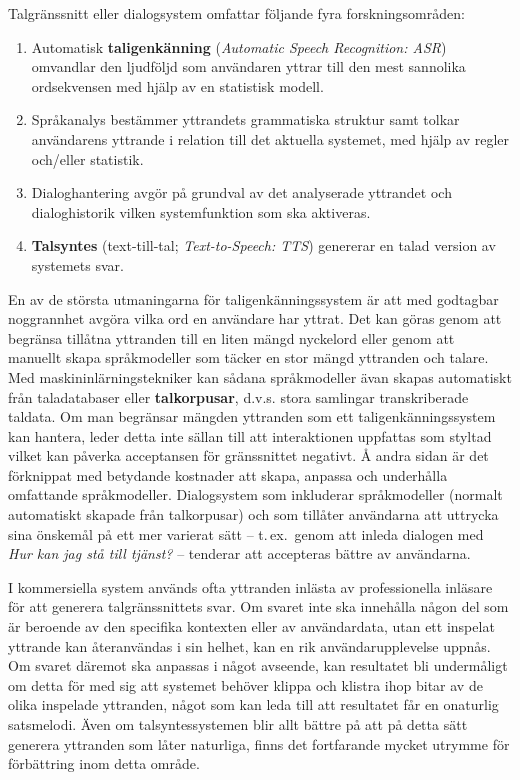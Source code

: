 \begin{multicols}{2}
Talgränssnitt eller dialogsystem omfattar följande fyra
forskningsområden:

\begin{enumerate}
\item Automatisk \textbf{taligenkänning} (\emph{Automatic Speech
  Recognition: ASR}) omvandlar den ljudföljd som användaren yttrar
  till den mest sannolika ordsekvensen med hjälp av en statistisk
  modell.
\item Språkanalys bestämmer yttrandets grammatiska struktur samt
  tolkar användarens yttrande i relation till det aktuella systemet,
  med hjälp av regler och/eller statistik.
\item Dialoghantering avgör på grundval av det analyserade yttrandet
  och dialoghistorik vilken systemfunktion som ska aktiveras.
\item \textbf{Talsyntes} (text-till-tal; \emph{Text-to-Speech: TTS})
  genererar en talad version av systemets svar.
\end{enumerate}

En av de största utmaningarna för taligenkänningssystem är att med
godtagbar noggrannhet avgöra vilka ord en användare har yttrat. Det
kan göras genom att begränsa tillåtna yttranden till en liten mängd
nyckelord eller genom att manuellt skapa språkmodeller som täcker en
stor mängd yttranden och talare. Med maskininlärningstekniker kan
sådana språkmodeller ävan skapas automatiskt från taladatabaser eller
\textbf{talkorpusar}, d.v.s. stora samlingar transkriberade
taldata. Om man begränsar mängden yttranden som ett
taligenkänningssystem kan hantera, leder detta inte sällan till att
interaktionen uppfattas som styltad vilket kan påverka acceptansen för
gränssnittet negativt. Å andra sidan är det förknippat med betydande
kostnader att skapa, anpassa och underhålla omfattande
språkmodeller. Dialogsystem som inkluderar språkmodeller (normalt
automatiskt skapade från talkorpusar) och som tillåter användarna att
uttrycka sina önskemål på ett mer varierat sätt -- t.\,ex.~genom att
inleda dialogen med \textit{Hur kan jag stå till tjänst?} -- tenderar
att accepteras bättre av användarna.


I kommersiella system används ofta yttranden inlästa av professionella
inläsare för att generera talgränssnittets svar. Om svaret inte ska
innehålla någon del som är beroende av den specifika kontexten eller
av användardata, utan ett inspelat yttrande kan återanvändas i sin
helhet, kan en rik användarupplevelse uppnås. Om svaret däremot ska
anpassas i något avseende, kan resultatet bli undermåligt om detta för
med sig att systemet behöver klippa och klistra ihop bitar av de olika
inspelade yttranden, något som kan leda till att resultatet får en
onaturlig satsmelodi. Även om talsyntessystemen blir allt bättre på
att på detta sätt generera yttranden som låter naturliga, finns det
fortfarande mycket utrymme för förbättring inom detta område.


\end{multicols}
